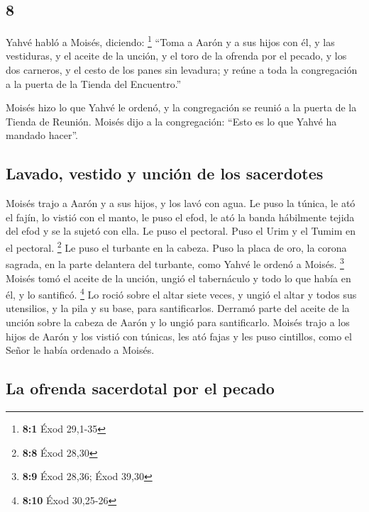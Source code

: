 \begin{paracol}{2}
\hypertarget{section-14}{%
\section{8}\label{section-14}}

 Yahvé habló a Moisés, diciendo: \footnote{\textbf{8:1}
  Éxod 29,1-35}  ``Toma a Aarón y a sus hijos con él, y
las vestiduras, y el aceite de la unción, y el toro de la ofrenda por el
pecado, y los dos carneros, y el cesto de los panes sin levadura;
 y reúne a toda la congregación a la puerta de la Tienda
del Encuentro.''

 Moisés hizo lo que Yahvé le ordenó, y la congregación se
reunió a la puerta de la Tienda de Reunión.  Moisés dijo a
la congregación: ``Esto es lo que Yahvé ha mandado hacer''.

\hypertarget{lavado-vestido-y-unciuxf3n-de-los-sacerdotes}{%
\subsection{Lavado, vestido y unción de los
sacerdotes}\label{lavado-vestido-y-unciuxf3n-de-los-sacerdotes}}

 Moisés trajo a Aarón y a sus hijos, y los lavó con agua.
 Le puso la túnica, le ató el fajín, lo vistió con el
manto, le puso el efod, le ató la banda hábilmente tejida del efod y se
la sujetó con ella.  Le puso el pectoral. Puso el Urim y
el Tumim en el pectoral. \footnote{\textbf{8:8} Éxod 28,30}
 Le puso el turbante en la cabeza. Puso la placa de oro,
la corona sagrada, en la parte delantera del turbante, como Yahvé le
ordenó a Moisés. \footnote{\textbf{8:9} Éxod 28,36; Éxod 39,30}
 Moisés tomó el aceite de la unción, ungió el tabernáculo
y todo lo que había en él, y lo santificó. \footnote{\textbf{8:10} Éxod
  30,25-26}  Lo roció sobre el altar siete veces, y ungió
el altar y todos sus utensilios, y la pila y su base, para
santificarlos.  Derramó parte del aceite de la unción
sobre la cabeza de Aarón y lo ungió para santificarlo. 
Moisés trajo a los hijos de Aarón y los vistió con túnicas, les ató
fajas y les puso cintillos, como el Señor le había ordenado a Moisés.

\hypertarget{la-ofrenda-sacerdotal-por-el-pecado}{%
\subsection{La ofrenda sacerdotal por el
pecado}\label{la-ofrenda-sacerdotal-por-el-pecado}}


\end{paracol}
